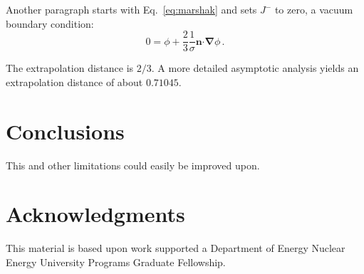 \documentclass{anstrans}
\renewcommand{\vec}[1]{\bm{#1}} %
\newcommand{\vd}{\bm{\cdot}} %
\newcommand{\grad}{\vec{\nabla}} %
\begin{document}
Another paragraph starts with Eq.~\eqref{eq:marshak} and sets $J^-$ to zero, a
vacuum boundary condition:
\begin{equation*}
  0 = \phi + \frac{2}{3} \frac{1}{\sigma} \vec{n} \vd \grad \phi \,.
\end{equation*}

The extrapolation distance is $2/3$. A more detailed asymptotic analysis yields
an extrapolation distance of about $0.71045$.

\section{Conclusions}


This and other limitations could easily be improved upon.  

\section{Acknowledgments}
This material is based upon work supported a Department of Energy Nuclear
Energy University Programs Graduate Fellowship.



\end{document}
